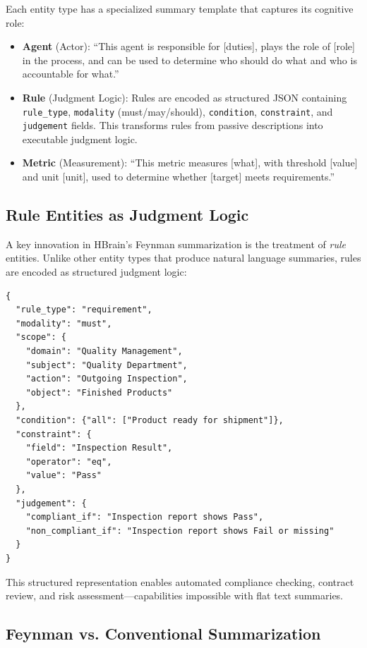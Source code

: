 \documentclass[11pt]{article}
\begin{document}
Each entity type has a specialized summary template that captures its cognitive role:

\begin{itemize}
    \item \textbf{Agent} (Actor): ``This agent is responsible for [duties], plays the role of [role] in the process, and can be used to determine who should do what and who is accountable for what.''

    \item \textbf{Rule} (Judgment Logic): Rules are encoded as structured JSON containing \texttt{rule\_type}, \texttt{modality} (must/may/should), \texttt{condition}, \texttt{constraint}, and \texttt{judgement} fields. This transforms rules from passive descriptions into executable judgment logic.

    \item \textbf{Metric} (Measurement): ``This metric measures [what], with threshold [value] and unit [unit], used to determine whether [target] meets requirements.''
\end{itemize}

\subsection{Rule Entities as Judgment Logic}

A key innovation in HBrain's Feynman summarization is the treatment of \textit{rule} entities. Unlike other entity types that produce natural language summaries, rules are encoded as structured judgment logic:

\begin{verbatim}
{
  "rule_type": "requirement",
  "modality": "must",
  "scope": {
    "domain": "Quality Management",
    "subject": "Quality Department",
    "action": "Outgoing Inspection",
    "object": "Finished Products"
  },
  "condition": {"all": ["Product ready for shipment"]},
  "constraint": {
    "field": "Inspection Result",
    "operator": "eq",
    "value": "Pass"
  },
  "judgement": {
    "compliant_if": "Inspection report shows Pass",
    "non_compliant_if": "Inspection report shows Fail or missing"
  }
}
\end{verbatim}

This structured representation enables automated compliance checking, contract review, and risk assessment---capabilities impossible with flat text summaries.

\subsection{Feynman vs. Conventional Summarization}
\end{document}
